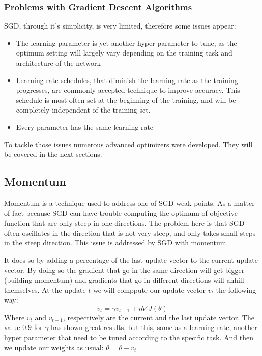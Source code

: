 {\subsubsection{Problems with Gradient Descent Algorithms}
SGD, through it's simplicity, is very limited, therefore some issues appear:

\begin{itemize}
\item The learning parameter is yet another hyper parameter to tune, as the optimum setting will largely vary depending on the training task and architecture of the network
\item Learning rate schedules, that diminish the learning rate as the training progresses, are commonly accepted technique to improve accuracy. This schedule is most often set at the beginning of the training, and will be completely independent of the training set. 
\item Every parameter has the same learning rate
\end{itemize}
To tackle those issues numerous advanced optimizers were developed. They will be covered in the next sections. 

\subsection{Momentum}
Momentum is a technique used to address one of SGD weak points. As a matter of fact because SGD can have trouble computing the optimum of objective function that are only steep in one directions. The problem here is that SGD often oscillates in the direction that is not very steep, and only takes small steps in the steep direction. This issue is addressed by SGD with momentum. 

It does so by adding a percentage of the last update vector  to the current update vector. By doing so the gradient that go in the same direction will get bigger (building momentum) and gradients that go in different directions will anhill themselves. 
 At the update $t$ we will comppute our update vector $v_t$ the following way:
\begin{equation}
v_t = \gamma v_{t-1} + \eta \nabla J (\theta)
\end{equation}\label{eq:momentum}
Where $v_t$ and $v_{t-1}$, respectively are the current and the last update vector. The value $0.9$ for $\gamma$ has shown great results, but this, same as a learning rate, another hyper parameter that need to be tuned according to the specific task. 
And then we update our weights as usual: $\theta = \theta - v_t$ 
}
